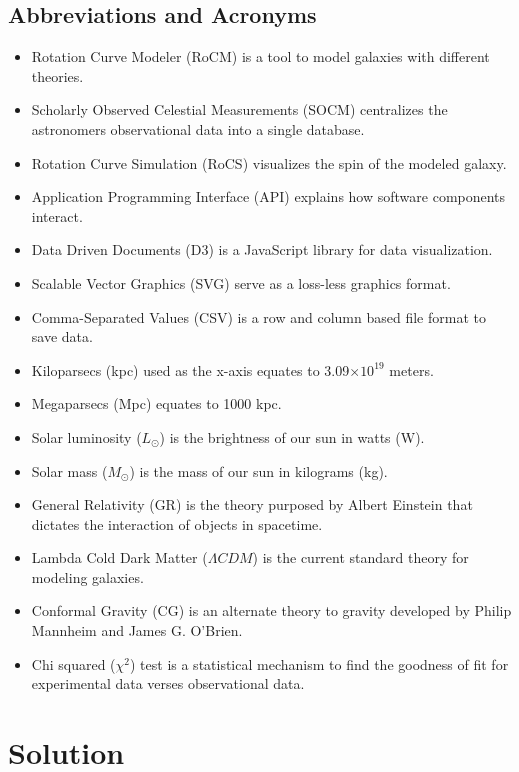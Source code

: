 \documentclass[conference]{IEEEtran}
\providecommand{\e}[1]{\ensuremath{\times 10^{#1}}}
\begin{document}
\subsection{Abbreviations and Acronyms}
\begin{itemize}
		\item Rotation Curve Modeler (RoCM) is a tool to model galaxies with different theories.
		\item Scholarly Observed Celestial Measurements (SOCM) centralizes the astronomers observational data into a single database.
		\item Rotation Curve Simulation (RoCS) visualizes the spin of the modeled galaxy.				\item Application Programming Interface (API) explains how software components interact.
		\item Data Driven Documents (D3) is a JavaScript library for data visualization.
		\item Scalable Vector Graphics (SVG) serve as a loss-less graphics format.
		\item Comma-Separated Values (CSV) is a row and column based file format to save data.
        \item Kiloparsecs (kpc) used as the x-axis equates to 3.09\e{19} meters.
        \item Megaparsecs (Mpc) equates to 1000 kpc.
        \item Solar luminosity ($L_{\odot}$) is the brightness of our sun in watts (W).
        \item Solar mass ($M_{\odot}$) is the mass of our sun in kilograms (kg). 
        \item General Relativity (GR) is the theory purposed by Albert Einstein that dictates the interaction of objects in spacetime.
        \item Lambda Cold Dark Matter ($\Lambda CDM$) is the current standard theory for modeling galaxies.
     	\item Conformal Gravity (CG) is an alternate theory to gravity developed by Philip Mannheim and James G. O'Brien.
        \item Chi squared ($\chi^2$) test is a statistical mechanism to find the goodness of fit for experimental data verses observational data.
        
\end{itemize}

\section{Solution}
\end{document}
